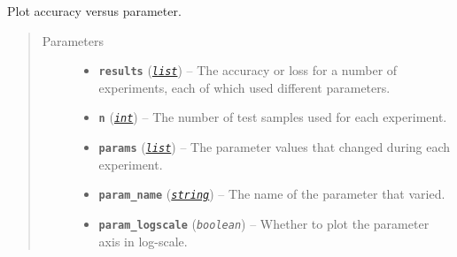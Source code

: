 \documentclass[letterpaper,10pt,english]{sphinxmanual}
\begin{document}

\begin{fulllineitems}
\label{snntoolbox.io_utils:snntoolbox.io_utils.plotting.plot_param_sweep}
Plot accuracy versus parameter.
\begin{quote}\begin{description}
\item[{Parameters}] \leavevmode\begin{itemize}
\item {} 
\textbf{\texttt{results}} (\href{https://docs.python.org/library/functions.html\#list}{\emph{\texttt{list}}}) -- The accuracy or loss for a number of experiments, each of which used
different parameters.

\item {} 
\textbf{\texttt{n}} (\href{https://docs.python.org/library/functions.html\#int}{\emph{\texttt{int}}}) -- The number of test samples used for each experiment.

\item {} 
\textbf{\texttt{params}} (\href{https://docs.python.org/library/functions.html\#list}{\emph{\texttt{list}}}) -- The parameter values that changed during each experiment.

\item {} 
\textbf{\texttt{param\_name}} (\href{https://docs.python.org/library/string.html\#module-string}{\emph{\texttt{string}}}) -- The name of the parameter that varied.

\item {} 
\textbf{\texttt{param\_logscale}} (\emph{\texttt{boolean}}) -- Whether to plot the parameter axis in log-scale.

\end{itemize}

\end{description}\end{quote}

\end{fulllineitems}

\end{document}
